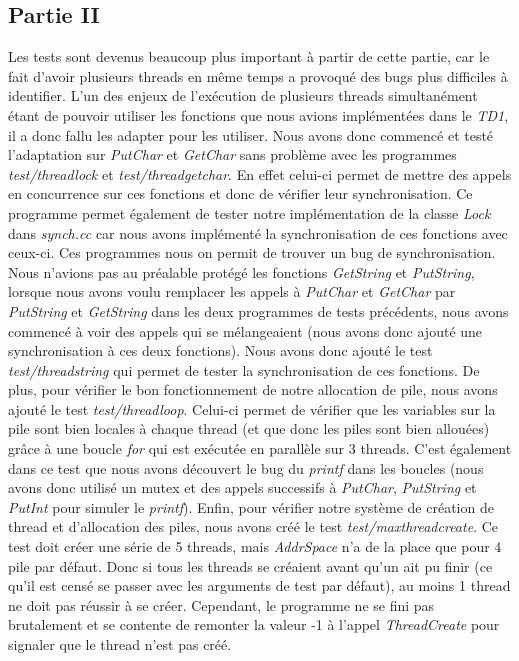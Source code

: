 \documentclass{article}
\begin{document}
\subsection{Partie II}
Les tests sont devenus beaucoup plus important à partir de cette partie, car le fait d'avoir plusieurs threads en même temps a
provoqué des bugs plus difficiles à identifier. L'un des enjeux de l'exécution de plusieurs threads simultanément étant de pouvoir
utiliser les fonctions que nous avions implémentées dans le \textit{TD1}, il a donc fallu les adapter pour les utiliser.
Nous avons donc commencé et testé l'adaptation sur \textit{PutChar} et \textit{GetChar} sans problème avec les programmes
\textit{test/threadlock} et \textit{test/threadgetchar}. En effet celui-ci permet de mettre des appels en concurrence sur ces fonctions 
et donc de vérifier leur synchronisation. Ce programme permet également de tester notre implémentation de la classe \textit{Lock} dans
 \textit{synch.cc} car nous avons implémenté la synchronisation de ces fonctions avec ceux-ci. Ces programmes nous on permit de trouver
 un bug de synchronisation. Nous n'avions pas au préalable protégé les fonctions \textit{GetString} et \textit{PutString}, lorsque nous 
 avons voulu remplacer les appels à \textit{PutChar} et \textit{GetChar} par \textit{PutString} et \textit{GetString} dans les deux
 programmes de tests précédents, nous avons commencé à voir des appels qui se mélangeaient (nous avons donc ajouté une synchronisation
 à ces deux fonctions). Nous avons donc ajouté le test \textit{test/threadstring} qui permet de tester la synchronisation de ces fonctions.
 De plus, pour vérifier le bon fonctionnement de notre allocation de pile, nous avons ajouté le test \textit{test/threadloop}. Celui-ci 
 permet de vérifier que les variables sur la pile sont bien locales à chaque thread (et que donc les piles sont bien allouées) grâce à une boucle
 \textit{for} qui est exécutée en parallèle sur 3 threads. C'est également dans ce test que nous avons découvert le bug du \textit{printf} dans
 les boucles (nous avons donc utilisé un mutex et des appels successifs à \textit{PutChar}, \textit{PutString} et \textit{PutInt} pour simuler le \textit{printf}).
 Enfin, pour vérifier notre système de création de thread et d'allocation des piles, nous avons créé le test \textit{test/maxthreadcreate}. Ce test doit créer
 une série de 5 threads, mais \textit{AddrSpace} n'a de la place que pour 4 pile par défaut. Donc si tous les threads se créaient avant qu'un ait pu finir
 (ce qu'il est censé se passer avec les arguments de test par défaut), au moins 1 thread ne doit pas réussir à se créer. Cependant, le programme ne se fini 
 pas brutalement et se contente de remonter la valeur -1 à l'appel \textit{ThreadCreate} pour signaler que le thread n'est pas créé.
\end{document}

